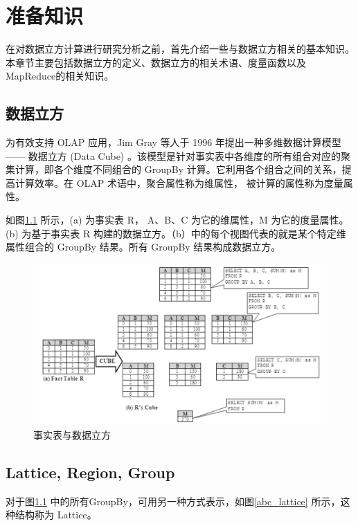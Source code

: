 \chapter{准备知识}

在对数据立方计算进行研究分析之前，首先介绍一些与数据立方相关的基本知识。本章节主要包括数据立方的定义、数据立方的相关术语、度量函数以及MapReduce的相关知识。

\section{数据立方}
为有效支持 OLAP 应用，Jim Gray 等人于 1996 年提出一种多维数据计算模型 —— 数据立方 (Data Cube) \cite{gray1997data}。该模型是针对事实表中各维度的所有组合对应的聚集计算，即各个维度不同组合的 GroupBy 计算。它利用各个组合之间的关系，提高计算效率。在 OLAP 术语中，聚合属性称为维属性， 被计算的属性称为度量属性。

如图\ref{fact_table_data_cube} 所示，(a) 为事实表 R， A、B、C 为它的维属性，M 为它的度量属性。(b) 为基于事实表 R 构建的数据立方。（b）中的每个视图代表的就是某个特定维属性组合的 GroupBy 结果。所有 GroupBy 结果构成数据立方。

\begin{figure}[!htb]
\centering\includegraphics[width=6in]{picture/ch_preliminary/fact_table_data_cube} 
\caption{事实表与数据立方}\label{fact_table_data_cube} 
\end{figure} 

\section{Lattice, Region, Group}

对于图\ref{fact_table_data_cube} 中的所有GroupBy，可用另一种方式表示，如图\ref{abc_lattice} 所示，这种结构称为 Lattice。

